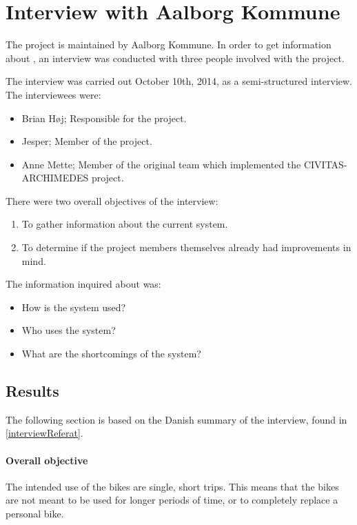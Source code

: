 \section{Interview with Aalborg Kommune}
The \citybike project is maintained by Aalborg Kommune.
In order to get information about \citybike, an interview was conducted with three people involved with the project.

The interview was carried out October 10th, 2014, as a semi-structured interview.
The interviewees were:
\begin{itemize}
\item Brian Høj; Responsible for the \citybike project.
\item Jesper; Member of the \citybike project.
\item Anne Mette; Member of the original team which implemented the CIVITAS-ARCHIMEDES project\cite{aalborgbycyklenbagcyklen}.
\end{itemize}

\noindent There were two overall objectives of the interview:
\begin{enumerate}
\item To gather information about the current system.
\item To determine if the project members themselves already had improvements in mind.
\end{enumerate}

The information inquired about was:
\begin{itemize}
\item How is the system used?
\item Who uses the system?
\item What are the shortcomings of the system?
\end{itemize}

\subsection{Results} \label{interview:goals}
The following section is based on the Danish summary of the interview, found in \cref{interviewReferat}.

\paragraph{Overall objective}
The intended use of the bikes are single, short trips.
This means that the bikes are not meant to be used for longer periods of time, or to completely replace a personal bike.

